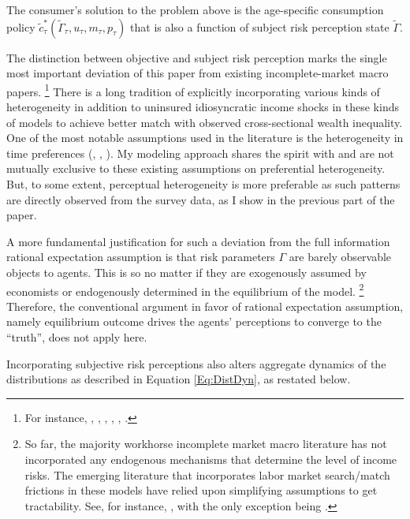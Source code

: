 The consumer's solution to the problem above is the age-specific consumption policy $\tilde c_\tau^*(\tilde \Gamma_\tau,u_\tau, m_\tau,p_\tau)$ that is also a function of subject risk perception state $\tilde \Gamma$.

The distinction between objective and subject risk perception marks the single most important deviation of this paper from existing incomplete-market macro papers. \footnote{For instance, \cite{bewley1976permanent}, \cite{huggett1993risk}, \cite{aiyagari1994uninsured}, \cite{krusell1998income},  \cite{krueger2016macroeconomics},  \cite{carroll2017distribution}.} There is a long tradition of explicitly incorporating various kinds of heterogeneity in addition to uninsured idiosyncratic income shocks in these kinds of models to achieve better match with observed cross-sectional wealth inequality. One of the most notable assumptions used in the literature is the heterogeneity in time preferences (\cite{krusell1998income}, \cite{carroll2017distribution}, \cite{krueger2016macroeconomics}). My modeling approach shares the spirit with and are not mutually exclusive to these existing assumptions on preferential heterogeneity. But, to some extent, perceptual heterogeneity is more preferable as such patterns are directly observed from the survey data, as I show in the previous part of the paper.  


A more fundamental justification for such a deviation from the full information rational expectation assumption is that risk parameters $\Gamma$ are barely observable objects to agents. This is so no matter if they are exogenously assumed by economists or endogenously determined in the equilibrium of the model. \footnote{So far, the majority workhorse incomplete market macro literature has not incorporated any endogenous mechanisms that determine the level of income risks. The emerging literature that incorporates labor market search/match frictions in these models have relied upon simplifying assumptions to get tractability. See, for instance, \cite{mckay2017time,acharya2020understanding,ravn2021macroeconomic},  with the only exception being \cite{ravn2017job}.} Therefore, the conventional argument in favor of rational expectation assumption, namely equilibrium outcome drives the agents' perceptions to converge to the ``truth'', does not apply here. 

Incorporating subjective risk perceptions also alters aggregate dynamics of the distributions as described in Equation \ref{Eq:DistDyn}, as restated below. 

